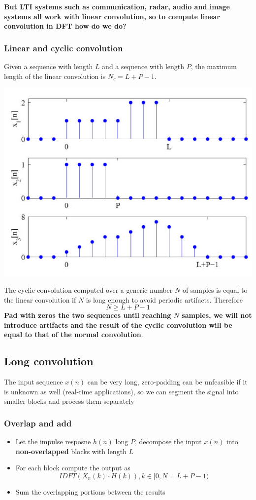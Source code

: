 \textbf{But LTI systems such as communication, radar, audio and image systems all work with linear convolution, so to compute linear convolution in DFT how do we do?}

\subsubsection{Linear and cyclic convolution}
Given a sequence with length $L$ and a sequence with length $P$, the maximum length of the linear convolution is $N_c=L+P-1$.
\begin{center}
    \includegraphics[width=1\textwidth]{images/cyclic_conv_01.png}
\end{center}
The cyclic convolution computed over a generic number $N$ of samples is equal to the linear convolution if $N$ is long enough to avoid periodic artifacts. Therefore
$$
N\geq L+P-1
$$
\textbf{Pad with zeros the two sequences until reaching $N$ samples, we will not introduce artifacts and the result of the cyclic convolution will be equal to that of the normal convolution}.

\subsection{Long convolution}
The input sequence $x(n)$ can be very long, zero-padding can be unfeasible if it is unknown as well (real-time applications), so we can segment the signal into smaller blocks and process them separately

\subsubsection{Overlap and add}
\begin{itemize}
    \item Let the impulse resposne $h(n)$ long $P$, decompose the input $x(n)$ into \textbf{non-overlapped} blocks with length $L$
    \item For each block compute the output as
    $$IDFT(X_n(k)\cdot H(k)),k\in [0,N=L+P-1)$$
    \item Sum the overlapping portions between the results
\end{itemize}

